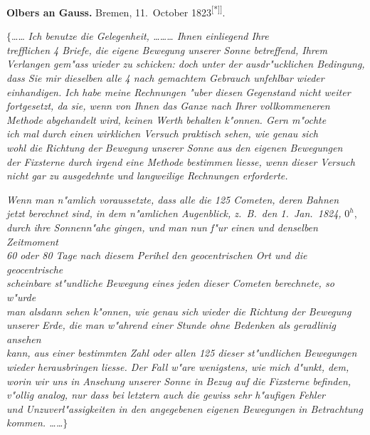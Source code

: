 \documentclass[12pt,a4paper]{article}
\theoremstyle{plain}
\theoremstyle{definition}
\theoremstyle{remark}
\begin{document}
\vspace{1em}
\begin{center}
\textbf{Olbers an Gauss.} \quad Bremen, 11.\ October 1823\textsuperscript{[*]]}.
\end{center}

\noindent
$\{$\ldots{}\ldots{} {\itshape Ich benutze die Gelegenheit, \ldots{}\ldots{}\ldots{} Ihnen einliegend Ihre} \\ {\itshape trefflichen 4 Briefe, die eigene Bewegung unserer Sonne betreffend, Ihrem} \\ {\itshape Verlangen gem"ass wieder zu schicken: doch unter der ausdr"ucklichen Bedingung,} \\ {\itshape dass Sie mir dieselben alle 4 nach gemachtem Gebrauch unfehlbar wieder} \\ {\itshape einhandigen. Ich habe meine Rechnungen "uber diesen Gegenstand nicht weiter} \\ {\itshape fortgesetzt, da sie, wenn von Ihnen das Ganze nach Ihrer vollkommeneren} \\ {\itshape Methode abgehandelt wird, keinen Werth behalten k"onnen. Gern m"ochte} \\ {\itshape ich mal durch einen wirklichen Versuch praktisch sehen, wie genau sich} \\ {\itshape wohl die Richtung der Bewegung unserer Sonne aus den eigenen Bewegungen} \\ {\itshape der Fixsterne durch irgend eine Methode bestimmen liesse, wenn dieser Versuch} \\ {\itshape nicht gar zu ausgedehnte und langweilige Rechnungen erforderte.}

{\itshape Wenn man n"amlich voraussetzte, dass alle die 125 Cometen, deren Bahnen} \\ {\itshape jetzt berechnet sind, in dem n"amlichen Augenblick, z.\ B.\ den 1.\ Jan.\ 1824,} $0^h$, \\ {\itshape durch ihre Sonnenn"ahe gingen, und man nun f"ur einen und denselben Zeitmoment} \\ {\itshape 60 oder 80 Tage nach diesem Perihel den geocentrischen Ort und die geocentrische} \\ {\itshape scheinbare st"undliche Bewegung eines jeden dieser Cometen berechnete, so w"urde} \\ {\itshape man alsdann sehen k"onnen, wie genau sich wieder die Richtung der Bewegung} \\ {\itshape unserer Erde, die man w"ahrend einer Stunde ohne Bedenken als geradlinig ansehen} \\ {\itshape kann, aus einer bestimmten Zahl oder allen 125 dieser st"undlichen Bewegungen} \\ {\itshape wieder herausbringen liesse. Der Fall w"are wenigstens, wie mich d"unkt, dem,} \\ {\itshape worin wir uns in Ansehung unserer Sonne in Bezug auf die Fixsterne befinden,} \\ {\itshape v"ollig analog, nur dass bei letztern auch die gewiss sehr h"aufigen Fehler} \\ {\itshape und Unzuverl"assigkeiten in den angegebenen eigenen Bewegungen in Betrachtung} \\ {\itshape kommen. \ldots{}\ldots{}$\}$}
\end{document}
